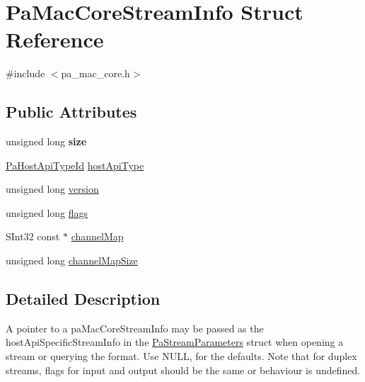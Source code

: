 \hypertarget{struct_pa_mac_core_stream_info}{\section{Pa\+Mac\+Core\+Stream\+Info Struct Reference}
\label{struct_pa_mac_core_stream_info}
}


{\ttfamily \#include $<$pa\+\_\+mac\+\_\+core.\+h$>$}

\subsection*{Public Attributes}
\begin{DoxyCompactItemize}
\item 
\hypertarget{struct_pa_mac_core_stream_info_a6a208a662332f447094b382a00a2a635}{unsigned long {\bfseries size}}\label{struct_pa_mac_core_stream_info_a6a208a662332f447094b382a00a2a635}

\item 
\hyperlink{portaudio_8h_a8eaebe3d39c5ea45598da8f86dc2e5ae}{Pa\+Host\+Api\+Type\+Id} \hyperlink{struct_pa_mac_core_stream_info_a63f4110b767bfbf2fa09b88f3252d91e}{host\+Api\+Type}
\item 
unsigned long \hyperlink{struct_pa_mac_core_stream_info_ad5ef9592026b8e98f2bf17a61677b064}{version}
\item 
unsigned long \hyperlink{struct_pa_mac_core_stream_info_afe018712e7c57198176ed72cb18f9938}{flags}
\item 
S\+Int32 const $\ast$ \hyperlink{struct_pa_mac_core_stream_info_a2339c27ad6b84924be79bf73e4402bd4}{channel\+Map}
\item 
unsigned long \hyperlink{struct_pa_mac_core_stream_info_aab3ecc35ef267ecebc8874d399061b87}{channel\+Map\+Size}
\end{DoxyCompactItemize}


\subsection{Detailed Description}
A pointer to a pa\+Mac\+Core\+Stream\+Info may be passed as the host\+Api\+Specific\+Stream\+Info in the \hyperlink{struct_pa_stream_parameters}{Pa\+Stream\+Parameters} struct when opening a stream or querying the format. Use N\+U\+L\+L, for the defaults. Note that for duplex streams, flags for input and output should be the same or behaviour is undefined. 

